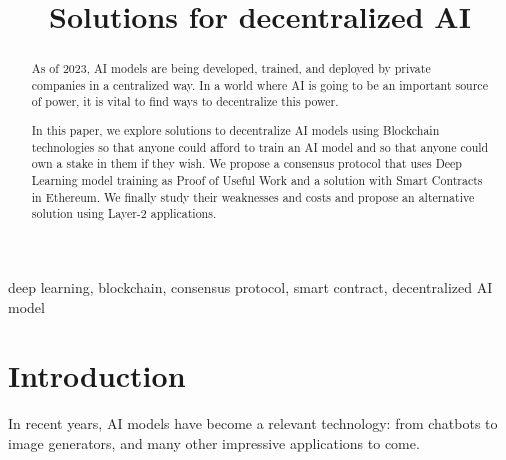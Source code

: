 \documentclass[conference]{IEEEtran}
\begin{document}
\title{Solutions for decentralized AI\\
}

\author{
\and
{}
\and
{}
}
\maketitle

\begin{abstract}
As of 2023, AI models are being developed, trained, and deployed by private companies in a centralized way. In a world where AI is going to be an important source of power, it is vital to find ways to decentralize this power.

In this paper, we explore solutions to decentralize AI models using Blockchain technologies so that anyone could afford to train an AI model and so that anyone could own a stake in them if they wish. We propose a consensus protocol that uses Deep Learning model training as Proof of Useful Work and a solution with Smart Contracts in Ethereum. We finally study their weaknesses and costs and propose an alternative solution using Layer-2 applications.
\end{abstract}

\begin{IEEEkeywords}
deep learning, blockchain, consensus protocol, smart contract, decentralized AI model
\end{IEEEkeywords}

\section{Introduction}
In recent years, AI models have become a relevant technology: from chatbots to image generators, and many other impressive applications to come.
\end{document}

